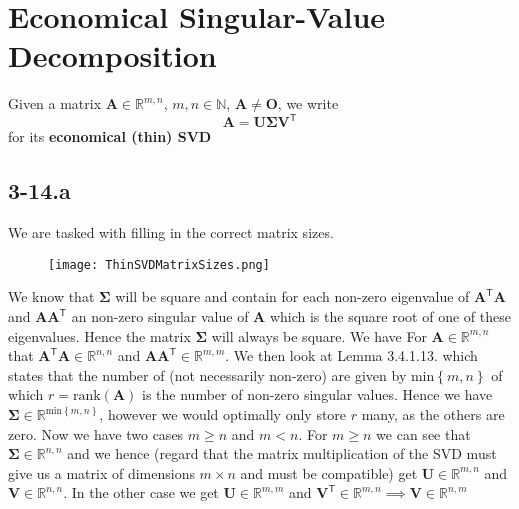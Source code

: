 \documentclass{article}
\begin{document}
\section*{Economical Singular-Value Decomposition}
Given a matrix $\mathbf{A}\in \mathbb{R}^{m,n}$, $m, n \in \mathbb{N}$, $\mathbf{A} \neq \mathbf{O}$, we write 
\begin{equation*}
    \mathbf{A} = \mathbf{U}\mathbf{\Sigma}\mathbf{V}^{\mathsf{T}}
\end{equation*}
for its \textbf{economical (thin) SVD}

\subsection*{3-14.a}
We are tasked with filling in the correct matrix sizes.

\begin{figure}[!hbt]
    \centering
\texttt{[image: ThinSVDMatrixSizes.png]}
\end{figure}
\noindent We know that $\mathbf{\Sigma}$ will be square and contain for each non-zero eigenvalue of $\mathbf{A}^{\mathsf{T}}\mathbf{A}$ and $\mathbf{A}\mathbf{A}^{\mathsf{T}}$ an non-zero singular value of $\mathbf{A}$ which is the square root of one of these eigenvalues. Hence the matrix $\mathbf{\Sigma}$ will always be square. We have For $\mathbf{A} \in \mathbb{R}^{m,n}$ that $\mathbf{A}^{\mathsf{T}}\mathbf{A} \in \mathbb{R}^{n,n}$ and $\mathbf{A}\mathbf{A}^{\mathsf{T}} \in \mathbb{R}^{m,m}$. We then look at Lemma 3.4.1.13. which states that the number of (not necessarily non-zero) are given by $\text{min}\left\{m,n\right\}$ of which $r = \text{rank}\left(\mathbf{A}\right)$ is the number of non-zero singular values. Hence we have $\mathbf{\Sigma}\in \mathbb{R}^{\text{min}\left\{m,n\right\}}$, however we would optimally only store $r$ many, as the others are zero. Now we have two cases $m \geq n$ and $m < n$. For $m \geq n$ we can see that $\mathbf{\Sigma}\in \mathbb{R}^{n,n}$ and we hence (regard that the matrix multiplication of the SVD must give us a matrix of dimensions $m \times n$ and must be compatible) get $\mathbf{U}\in \mathbb{R}^{m,n}$ and $\mathbf{V}\in \mathbb{R}^{n,n}$. In the other case we get $\mathbf{U}\in \mathbb{R}^{m,m}$ and $\mathbf{V}^{\mathsf{T}}\in \mathbb{R}^{m,n} \implies \mathbf{V}\in \mathbb{R}^{n,m}$
\end{document}
